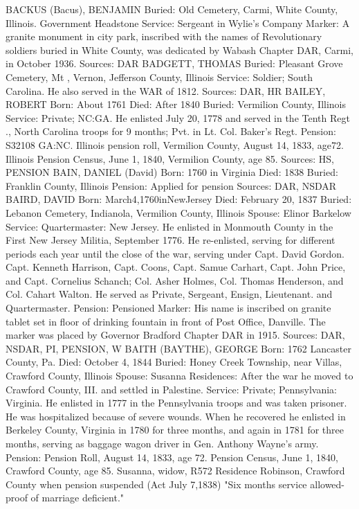 BACKUS (Bacus), BENJAMIN 
Buried: Old Cemetery, Carmi, White County, Illinois. Government Headstone 
Service: Sergeant in Wylie's Company 
Marker: A granite monument in city park, inscribed with the names of Revolu­tionary soldiers buried in White County, was dedicated by Wabash Chapter DAR, Carmi, in October 1936. 
Sources: DAR 
BADGETT, THOMAS 
Buried: Pleasant Grove Cemetery, Mt , Vernon, Jefferson County, Illinois 
Service: Soldier; South Carolina. He also served in the WAR of 1812. 
Sources: DAR, HR 
BAILEY, ROBERT 
Born: About 1761 
Died: After 1840 
Buried: Vermilion County, Illinois 
Service: Private; NC:GA. He enlisted July 20, 1778 and served in the Tenth Regt ., 
North Carolina troops for 9 months; Pvt. in Lt. Col. Baker's Regt. 
Pension: S32108 GA:NC. Illinois pension roll, Vermilion County, August 14, 1833, age72. Illinois Pension Census, June 1, 1840, Vermilion County, age 85. 
Sources: HS, PENSION 
BAIN, DANIEL (David) 
Born: 1760 in Virginia 
Died: 1838 
Buried: Franklin County, Illinois 
Pension: Applied for pension 
Sources: DAR, NSDAR 
BAIRD, DAVID 
Born: March4,1760inNewJersey 
Died: February 20, 1837 
Buried: Lebanon Cemetery, Indianola, Vermilion County, Illinois 
Spouse: Elinor Barkelow 
Service: Quartermaster: New Jersey. He enlisted in Monmouth County in the 
First New Jersey Militia, September 1776. He re-enlisted, serving for different periods each year until the close of the war, serving under Capt. David Gordon. Capt. Kenneth Harrison, Capt. Coons, Capt. Samue Carhart, Capt. John Price, and Capt. Cornelius Schanch; Col. Asher Holmes, Col. Thomas Henderson, and Col. Cahart Walton. He served as Private, Sergeant, Ensign, Lieutenant. and Quartermaster. 
Pension: Pensioned Marker: His name is inscribed on granite tablet set in floor of drinking fountain in front of Post Office, Danville. The marker was placed by Governor Brad­ford Chapter DAR in 1915. 
Sources: DAR, NSDAR, PI, PENSION, W 
BAITH (BAYTHE), GEORGE 
Born: 1762 Lancaster County, Pa. 
Died: October 4, 1844 
Buried: Honey Creek Township, near Villas, Crawford County, Illinois 
Spouse: Susanna 
Residences: After the war he moved to Crawford County, III. and settled in Palestine. 
Service: Private; Pennsylvania: Virginia. He enlisted in 1777 in the Pennsylvania troops and was taken prisoner. He was hospitalized because of severe wounds. 
When he recovered he enlisted in Berkeley County, Virginia in 1780 for three months, and again in 1781 for three months, serving as baggage wagon driver in Gen. Anthony Wayne's army. 
Pension: Pension Roll, August 14, 1833, age 72. Pension Census, June 1, 1840, Crawford County, age 85. Susanna, widow, R572 Residence Robinson, Craw­ford County when pension suspended (Act July 7,1838) "Six months service allowed-proof of marriage deficient." 
